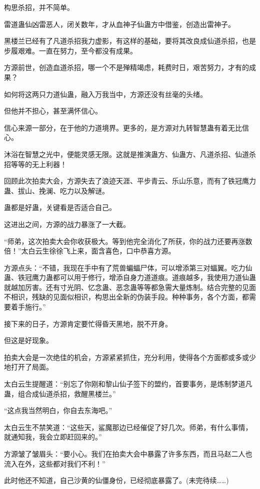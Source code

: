 \begin{this_body}
构思杀招，并不简单。

雷道蛊仙凶雷恶人，闭关数年，才从血神子仙蛊方中借鉴，创造出雷神子。

黑楼兰已经有了凡道杀招我力虚影，有这样的基础，要将其改良成仙道杀招，也是步履艰难。一直在努力，至今都没有成果。

方源前世，创造血道杀招，哪一个不是殚精竭虑，耗费时日，艰苦努力，才有的成果？

如何将这两只力道仙蛊，融入万我当中，方源还没有丝毫的头绪。

但他并不担心，甚至满怀信心。

信心来源一部分，在于他的力道境界。更多的，是方源对九转智慧蛊有着无比信心。

沐浴在智慧之光中，便能灵感无限。这就是推演蛊方、仙蛊方、凡道杀招、仙道杀招等等的无上利器！

回顾此次拍卖大会，方源失去了浪迹天涯、平步青云、乐山乐意，而有了铁冠鹰力蛊、拔山、挽澜、吃力以及解谜。

蛊都是好蛊，关键看是否适合自己。

这进出之间，方源的战力暴涨了一大截。

“师弟，这次拍卖大会你收获极大。等到他完全消化了所获，你的战力还要再涨数倍！”太白云生徐徐飞上来，面含喜色，口中恭喜方源。

方源点头：“不错，我现在手中有了荒兽蝙蝠尸体，可以增添第三对蝠翼。吃力仙蛊、铁冠鹰力蛊都可以用于修行，增添自身力道道痕。道痕越多，我使用力道仙蛊就越加厉害。还有寸光阴、忆念蛊、恶念蛊等等都急需大量炼制。结合完整的见面不相识，残缺的见面似相识，构思出全新的伪装手段。种种事务，各个方面，都需要着手施行。”

接下来的日子，方源肯定要忙得昏天黑地，脱不开身。

但这是好现象。

拍卖大会是一次绝佳的机会，方源紧紧抓住，充分利用，使得各个方面都或多或少地打开了局面。

太白云生提醒道：“别忘了你刚和黎山仙子签下的盟约，首要事务，是炼制梦道凡蛊，组合成仙道杀招，救醒黑楼兰。”

“这点我当然明白，你自去东海吧。”

太白云生不禁笑道：“这些天，鲨魔那边已经催促了好几次。师弟，有什么事情，就通知我，我会立即赶回来的。”

方源皱了皱眉头：“要小心。我们在拍卖大会中暴露了许多东西，而且马赵二人也流入在外，这些都对我们不利！”

此时他还不知道，自己沙黄的仙僵身份，已经彻底暴露了。(未完待续……)

\end{this_body}

